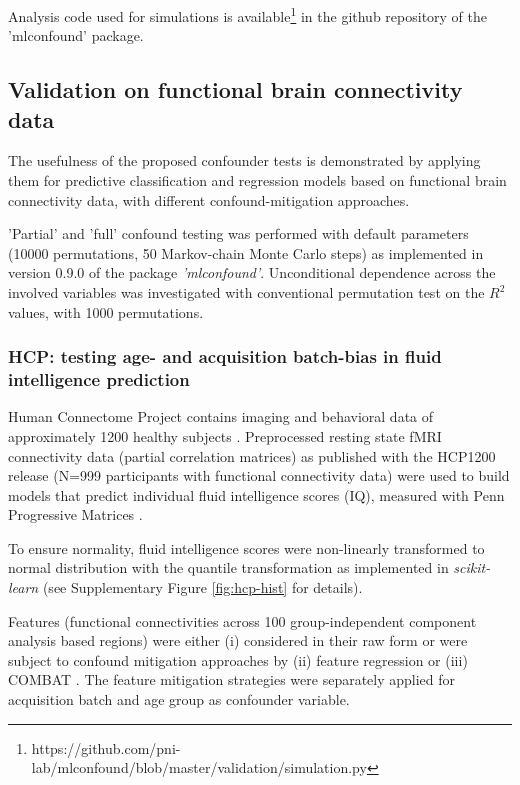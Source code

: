 \documentclass{article}
\begin{document}
Analysis code used for simulations is available\footnote{https://github.com/pni-lab/mlconfound/blob/master/validation/simulation.py} in the github repository of the 'mlconfound' package.

\subsection{Validation on functional brain connectivity data}

The usefulness of the proposed confounder tests is demonstrated by applying them for predictive classification and regression models based on functional brain connectivity data, with different confound-mitigation approaches. 

'Partial' and 'full' confound testing was performed with default parameters (10000 permutations, 50 Markov-chain Monte Carlo steps) as implemented in version 0.9.0 of the package \emph{'mlconfound'}. Unconditional dependence across the involved variables was investigated with conventional permutation test on the $R^2$ values, with 1000 permutations. 

\subsubsection*{HCP: testing age- and acquisition batch-bias in fluid intelligence prediction}

Human Connectome Project contains imaging and behavioral data of approximately 1200 healthy subjects \citep{van2013wu}. Preprocessed resting state fMRI connectivity data (partial correlation matrices) \citep{glasser2013minimal} as published with the HCP1200 release (N=999 participants with functional connectivity data) were used to build models that predict individual fluid intelligence scores (IQ), measured with Penn Progressive Matrices \citep{duncan2000neural}.

To ensure normality, fluid intelligence scores were non-linearly transformed to normal distribution with the quantile transformation \citep{beasley2009rank} as implemented in \emph{scikit-learn} \citep{pedregosa2011scikit} (see Supplementary Figure \ref{fig:hcp-hist} for details).

Features (functional connectivities across 100 group-independent component analysis based regions) were either (i) considered in their raw form or were subject to confound mitigation approaches by (ii) feature regression \citep{rao2017predictive} or (iii) COMBAT \citep{johnson2007adjusting, fortin2018harmonization}.
The feature mitigation strategies were separately applied for acquisition batch and age group as confounder variable.
\end{document}
